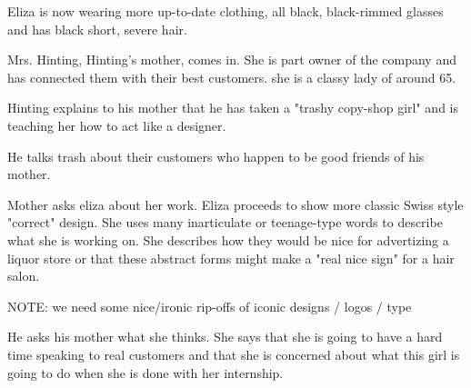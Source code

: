 \act


Eliza is now wearing more up-to-date clothing, all black, black-rimmed glasses and has black short, severe hair.

Mrs. Hinting, Hinting's mother, comes in.  She is part owner of the company and has connected them with their best customers.  she is a classy lady of around 65.

Hinting explains to his mother that he has taken a "trashy copy-shop girl" and is teaching her how to act like a designer.  

He talks trash about their customers who happen to be good friends of his mother.  

Mother asks eliza about her work.  Eliza proceeds to show more classic Swiss style "correct" design.  She uses many inarticulate or teenage-type words to describe what she is working on.  She describes how they would be nice for advertizing a liquor store or that these abstract forms might make a "real nice sign" for a hair salon.

NOTE: we need some nice/ironic rip-offs of iconic designs / logos / type

He asks his mother what she thinks.  She says that she is going to have a hard time speaking to real customers and that she is concerned about what this girl is going to do when she is done with her internship.

